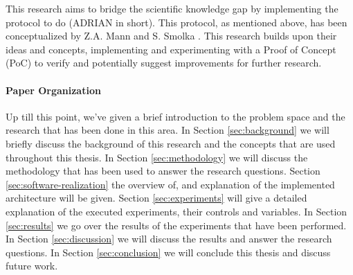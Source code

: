 This research aims to bridge the scientific knowledge gap by implementing the protocol to do \ADRIAN (ADRIAN in short). This protocol, as mentioned above, has been conceptualized by Z.A. Mann and S. Smolka \cite{mann2023ADRIAN}. This research builds upon their ideas and concepts, implementing and experimenting with a Proof of Concept (PoC) to verify and potentially suggest improvements for further research. 

\paragraph{Paper Organization}
Up till this point, we've given a brief introduction to the problem space and the research that has been done in this area. In Section \ref{sec:background} we will briefly discuss the background of this research and the concepts that are used throughout this thesis. In Section \ref{sec:methodology} we will discuss the methodology that has been used to answer the research questions. Section \ref{sec:software-realization} the overview of, and explanation of the implemented architecture will be given. Section \ref{sec:experiments} will give a detailed explanation of the executed experiments, their controls and variables. In Section \ref{sec:results} we go over the results of the experiments that have been performed. In Section \ref{sec:discussion} we will discuss the results and answer the research questions. In Section \ref{sec:conclusion} we will conclude this thesis and discuss future work.
